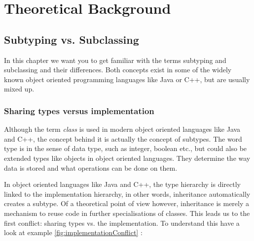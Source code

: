 
\part{Theoretical Background}
\chapter{Subtyping vs. Subclassing}
In this chapter we want you to get familiar with the terms subtyping
and subclassing and their differences. Both concepts exist in some of
the widely known object oriented programming languages like Java or C++, but are
usually mixed up.

\section{Sharing types versus implementation}
\label{sec:sharingTypes}

Although the term \emph{class} is used in modern object oriented
languages like Java and C++, the concept behind it is actually the
concept of subtypes.  The word type is in the sense of data type, such
as integer, boolean etc., but could also be extended types like objects
in object oriented languages. They determine the way data is stored and
what operations can be done on them.

In object oriented languages like Java and C++, the type hierarchy
is directly linked to the implementation hierarchy, in other words,
inheritance automatically creates a subtype. Of a theoretical point
of view however, inheritance is merely a mechanism to reuse code in
further specialisations of classes. This leads us to the first conflict:
sharing types vs. the implementation. To understand this have a look at
example \ref{fig:implementationConflict} \cite{simons_theory_2003-4}:

